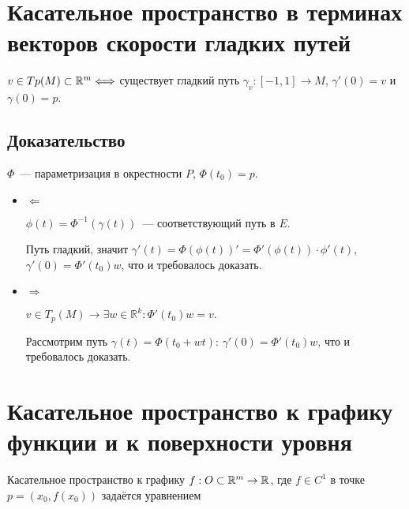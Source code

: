 \documentclass{article}
\begin{document}
    \newpage
    
    \section{Касательное пространство в терминах векторов скорости гладких путей}
    
        $v \in Tp(M) \subset \mathbb{R}^m \Longleftrightarrow$ существует гладкий путь $\gamma_v : [-1, 1] \rightarrow M$, $\gamma'(0) = v$ и $\gamma(0) = p$.
        
        \subsection{Доказательство}
        
            $\Phi$~--- параметризация в окрестности $P$, $\Phi(t_0) = p$.
            
            \begin{itemize}
            
                \item $\Leftarrow$
                
                    $\phi(t) = \Phi^{-1} ( \gamma (t) )$~--- соответствующий путь в $E$.
                    
                    Путь гладкий, значит $\gamma'(t) = \Phi(\phi(t))' = \Phi'(\phi(t)) \cdot \phi'(t)$, $\gamma'(0) = \Phi'(t_0)w$, что и требовалось доказать.
                    
                \item $\Rightarrow$
                
                    $v \in T_p(M) \rightarrow \exists w \in \mathbb{R}^k : \Phi'(t_0)w = v$.
                    
                    Рассмотрим путь $\gamma(t) = \Phi(t_0 + wt)$: $\gamma'(0) = \Phi'(t_0)w$, что и требовалось доказать.
                
            \end{itemize}
            
    \newpage
    
    \section{Касательное пространство к графику функции и к поверхности уровня}
    
        Касательное пространство к графику $f : O \subset \mathbb{R}^m \rightarrow \mathbb{R}$, где $f \in C^1$ в точке $p = (x_0, f(x_0))$ задаётся уравнением
        
\end{document}
